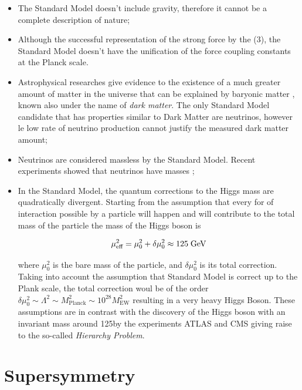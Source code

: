 \begin{itemize}
	\item The Standard Model doesn't include gravity, therefore it cannot be a complete description of nature;
	\item Although the successful representation of the strong force by the (3), the Standard Model doesn't have the unification of the force coupling constants at the Planck scale.
	\item Astrophysical researches give evidence to the existence of a much greater amount of matter in the universe that can be explained by baryonic matter \cite{deBoer:2005tm}, known also under the name of \textit{dark matter}. The only Standard Model candidate that has properties similar to Dark Matter are neutrinos, however le low rate of neutrino production cannot justify the measured dark matter amount;
	\item Neutrinos are considered massless by the Standard Model. Recent experiments showed that neutrinos have masses \cite{Fukuda:1998mi};
	\item In the Standard Model, the quantum corrections to the Higgs mass are quadratically divergent. Starting from the assumption that every for of interaction possible by a particle will happen and will contribute to the total mass of the particle the mass of the Higgs boson is 
	
	\begin{equation}
	\mu^{2}_{\text{eff}} = \mu^{2}_{0} + \delta\mu^{2}_{0} \approx 125\;\text{Ge}\kern-0.06667em\text{V}
	\end{equation}
	
	where $\mu^{2}_{0}$ is the bare mass of the particle, and $\delta\mu^{2}_{0} $ is its total correction. Taking into account the assumption that Standard Model is correct up to the Plank scale, the total correction woul be of the order  $\delta\mu^{2}_{0}  \sim \Lambda^{2} \sim M^{2}_{\text{Planck}} \sim 10^{28}M^{2}_{\text{EW}}$ resulting in a very heavy Higgs Boson. These assumptions are in contrast with the discovery of the Higgs boson with an invariant mass around 125\gev by the experiments ATLAS \cite{Aad:2012tfa} and CMS \cite{Chatrchyan:2012xdj} giving raise to the so-called \textit{Hierarchy Problem}.
	
\end{itemize}

\clearpage

\section{Supersymmetry}

